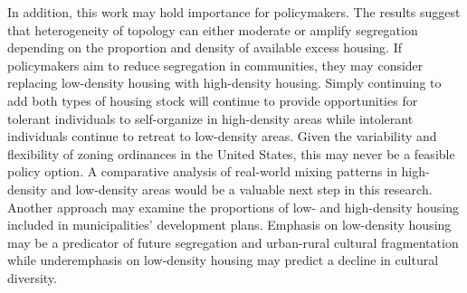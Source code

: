 \documentclass[a4paper]{article}
\begin{document}
In addition, this work may hold importance for policymakers. The results suggest that heterogeneity of topology can either moderate or amplify segregation depending on the proportion and density of available excess housing. If policymakers aim to reduce segregation in communities, they may consider replacing low-density housing with high-density housing. Simply continuing to add both types of housing stock will continue to provide opportunities for tolerant individuals to self-organize in high-density areas while intolerant individuals continue to retreat to low-density areas. Given the variability and flexibility of zoning ordinances in the United States, this may never be a feasible policy option. A comparative analysis of real-world mixing patterns in high-density and low-density areas would be a valuable next step in this research. Another approach may examine the proportions of low- and high-density housing included in municipalities' development plans. Emphasis on low-density housing may be a predicator of future segregation and urban-rural cultural fragmentation while underemphasis on low-density housing may predict a decline in cultural diversity.



\end{document}
